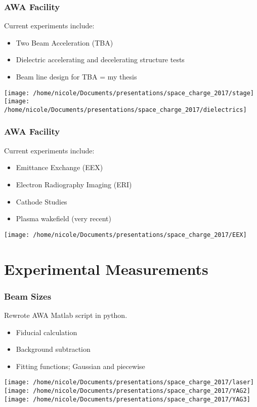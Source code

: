 \documentclass[professionalfonts,t]{beamer}
\begin{document}
\begin{frame}
\frametitle{AWA Facility}
Current experiments include:
\begin{itemize}
	\item{Two Beam Acceleration (TBA)}
	\item{Dielectric accelerating and decelerating structure tests}
	\item{Beam line design for TBA = my thesis}
\end{itemize}
\vspace{0.5cm}
\texttt{[image: /home/nicole/Documents/presentations/space\_charge\_2017/stage]}\hfill\texttt{[image: /home/nicole/Documents/presentations/space\_charge\_2017/dielectrics]}

\end{frame}

\begin{frame}
\frametitle{AWA Facility}
Current experiments include:
\begin{itemize}
\item{Emittance Exchange (EEX)}
\item{Electron Radiography Imaging (ERI)}
\item{Cathode Studies}
\item Plasma wakefield (very recent)
\end{itemize}
\vspace{0.3cm}
\centering
\texttt{[image: /home/nicole/Documents/presentations/space\_charge\_2017/EEX]}
\end{frame}


\section{Experimental Measurements}

\begin{frame}
\frametitle{Beam Sizes}
Rewrote AWA Matlab script in python.
\begin{itemize}
	\item Fiducial calculation
	\item Background subtraction 
	\item Fitting functions; Gaussian and piecewise
\end{itemize}	

\vspace{1em}
\centering
\texttt{[image: /home/nicole/Documents/presentations/space\_charge\_2017/laser]}%
\texttt{[image: /home/nicole/Documents/presentations/space\_charge\_2017/YAG2]}%
\texttt{[image: /home/nicole/Documents/presentations/space\_charge\_2017/YAG3]}

\end{frame}
\end{document}
